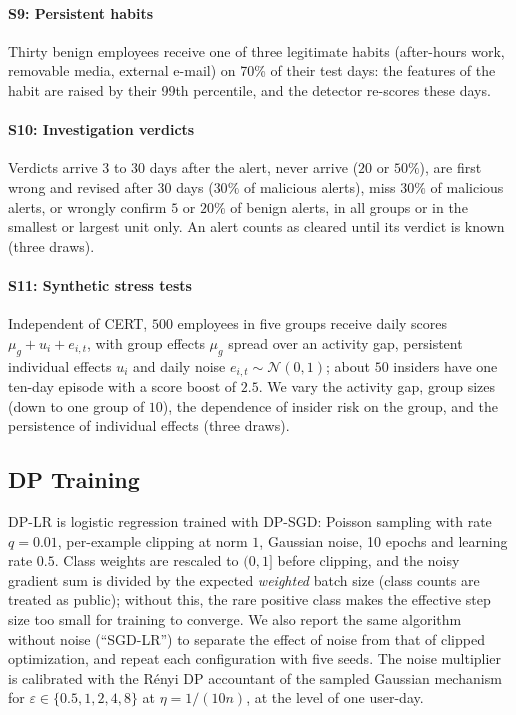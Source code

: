 \documentclass[10pt,onecolumn,letterpaper]{article}
\begin{document}
\paragraph{S9: Persistent habits} Thirty benign employees receive one of three legitimate habits (after-hours work, removable media, external e-mail) on 70\% of their test days: the features of the habit are raised by their 99th percentile, and the detector re-scores these days.

\paragraph{S10: Investigation verdicts} Verdicts arrive $3$ to $30$ days after the alert, never arrive ($20$ or $50\%$), are first wrong and revised after $30$ days ($30\%$ of malicious alerts), miss $30\%$ of malicious alerts, or wrongly confirm $5$ or $20\%$ of benign alerts, in all groups or in the smallest or largest unit only. An alert counts as cleared until its verdict is known (three draws).

\paragraph{S11: Synthetic stress tests} Independent of CERT, $500$ employees in five groups receive daily scores $\mu_g+u_i+e_{i,t}$, with group effects $\mu_g$ spread over an activity gap, persistent individual effects $u_i$ and daily noise $e_{i,t}\sim\mathcal{N}(0,1)$; about $50$ insiders have one ten-day episode with a score boost of $2.5$. We vary the activity gap, group sizes (down to one group of $10$), the dependence of insider risk on the group, and the persistence of individual effects (three draws).

\subsection{DP Training}
\label{sec:s-dptrain}
DP-LR is logistic regression trained with DP-SGD: Poisson sampling with rate $q=0.01$, per-example clipping at norm $1$, Gaussian noise, 10 epochs and learning rate $0.5$. Class weights are rescaled to $(0,1]$ before clipping, and the noisy gradient sum is divided by the expected \emph{weighted} batch size (class counts are treated as public); without this, the rare positive class makes the effective step size too small for training to converge. We also report the same algorithm without noise (``SGD-LR'') to separate the effect of noise from that of clipped optimization, and repeat each configuration with five seeds. The noise multiplier is calibrated with the R\'enyi DP accountant of the sampled Gaussian mechanism  for $\varepsilon\in\{0.5,1,2,4,8\}$ at $\eta=1/(10n)$, at the level of one user-day.
\end{document}
